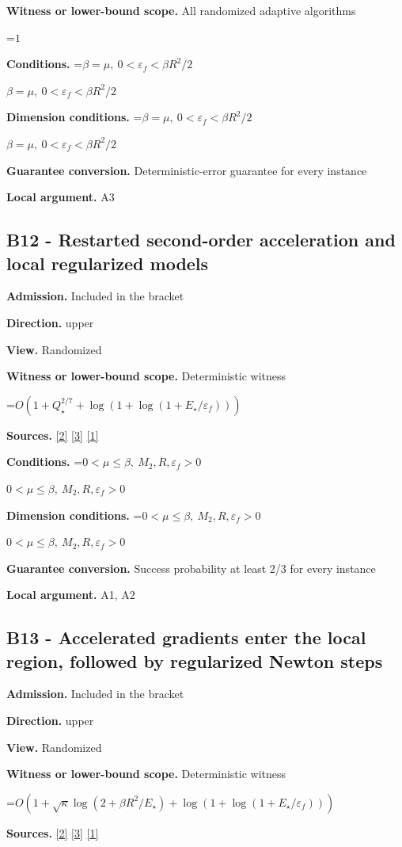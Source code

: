 \documentclass[10pt,a4paper]{article}
\newcommand{\AtlasMath}[1]{\par\begingroup\centering\setbox0=\hbox{$\displaystyle #1$}\ifdim\wd0>1.4\linewidth\typeout{ATLAS WIDE FORMULA: \the\wd0}\fi\ifdim\wd0>\linewidth\resizebox{\linewidth}{!}{\box0}\else\box0\fi\par\endgroup}
\newcommand{\AtlasInlineMath}[1]{\begingroup\setbox0=\hbox{$#1$}\ifdim\wd0>.4\linewidth\endgroup\AtlasMath{#1}\else\endgroup$#1$\fi}
\begin{document}
\textbf{Witness or lower-bound scope.} All randomized adaptive algorithms

\AtlasMath{1}
\textbf{Conditions.} \AtlasInlineMath{\beta=\mu,\ 0<\varepsilon_f<\beta R^2/2}

\textbf{Dimension conditions.} \AtlasInlineMath{\beta=\mu,\ 0<\varepsilon_f<\beta R^2/2}

\textbf{Guarantee conversion.} Deterministic-error guarantee for every instance

\textbf{Local argument.} A3

\subsection{B12 - Restarted second-order acceleration and local regularized models}
\textbf{Admission.} Included in the bracket

\textbf{Direction.} upper

\textbf{View.} Randomized

\textbf{Witness or lower-bound scope.} Deterministic witness

\AtlasMath{O(1+Q_\star^{2/7}+\log(1+\log(1+E_\star/\varepsilon_f)))}
\textbf{Sources.} \href{https://arxiv.org/pdf/2205.09647v1}{[2]} \href{https://arxiv.org/pdf/2010.06642v2}{[3]} \href{https://arxiv.org/pdf/1705.07260v2}{[1]}

\textbf{Conditions.} \AtlasInlineMath{0<\mu\le\beta,\ M_2,R,\varepsilon_f>0}

\textbf{Dimension conditions.} \AtlasInlineMath{0<\mu\le\beta,\ M_2,R,\varepsilon_f>0}

\textbf{Guarantee conversion.} Success probability at least 2/3 for every instance

\textbf{Local argument.} A1, A2

\subsection{B13 - Accelerated gradients enter the local region, followed by regularized Newton steps}
\textbf{Admission.} Included in the bracket

\textbf{Direction.} upper

\textbf{View.} Randomized

\textbf{Witness or lower-bound scope.} Deterministic witness

\AtlasMath{O(1+\sqrt\kappa\log(2+\beta R^2/E_\star)+\log(1+\log(1+E_\star/\varepsilon_f)))}
\textbf{Sources.} \href{https://arxiv.org/pdf/2205.09647v1}{[2]} \href{https://arxiv.org/pdf/2010.06642v2}{[3]} \href{https://arxiv.org/pdf/1705.07260v2}{[1]}
\end{document}
